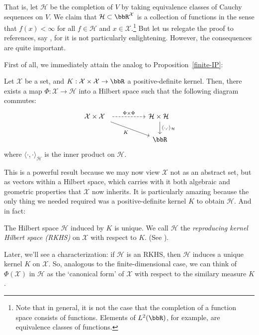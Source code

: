 \documentclass[twoside,11pt]{homework}
\begin{document}
\begin{multicols}{2}
That is, let $\mathcal{H}$ be the completion of $V$ by taking equivalence classes of Cauchy sequences on $V$. We claim that $\mathcal{H} \subset \bbR^\mathcal{X}$ is a collection of functions in the sense that $f(x) < \infty$ for all $f \in \mathcal{H}$ and $x \in \mathcal{X}$.\footnote{Note that in general, it is not the case that the completion of a function space consists of functions. Elements of $L^2(\bbR)$, for example, are equivalence classes of functions.} But let us relegate the proof to references, say \cite[Thm 3.16]{P2009}, for it is not particularly enlightening. However, the consequences are quite important.

First of all, we immediately attain the analog to Proposition~\ref{finite-IP}:

\begin{proposition}
  Let $\mathcal{X}$ be a set, and $K: \mathcal{X} \times \mathcal{X} \to \bbR$ a positive-definite kernel. Then, there exists a map $\Phi: \mathcal{X} \to \mathcal{H}$ into a Hilbert space such that the following diagram commutes:
    \[\begin{tikzcd}
\mathcal{X} \times \mathcal{X}\ \  \arrow[dashed, rr, "\Phi \times \Phi"] \arrow[drr, "K"'] & & \mathcal{H}\times \mathcal{H} \ \arrow[d, "{\langle\cdot,\cdot \rangle_\mathcal{H}}"] \\
& & \bbR
\end{tikzcd}
    \]
    where $\langle \cdot, \cdot\rangle_\mathcal{H}$ is the inner product on $\mathcal{H}$.
\end{proposition}
This is a powerful result because we may now view $\mathcal{X}$ not as an abstract set, but as vectors within a Hilbert space, which carries with it both algebraic and geometric properties that $\mathcal{X}$ now inherits. It is particularly amazing because the only thing we needed required was a positive-definite kernel $K$ to obtain $\mathcal{H}$. And in fact:
\begin{fact}
  The Hilbert space $\mathcal{H}$ induced by $K$ is unique. We call $\mathcal{H}$ the \emph{reproducing kernel Hilbert space (RKHS)} on $\mathcal{X}$ with respect to $K$. (See \cite[Prop 3.3]{P2009}).
\end{fact}

Later, we'll see a characterization: if $\mathcal{H}$ is an RKHS, then $\mathcal{H}$ induces a unique kernel $K$ on $\mathcal{X}$. So, analogous to the finite-dimensional case, we can think of $\Phi(\mathcal{X})$ in $\mathcal{H}$ as the `canonical form' of $\mathcal{X}$ with respect to the similary measure $K$.




\end{multicols}
\end{document}
